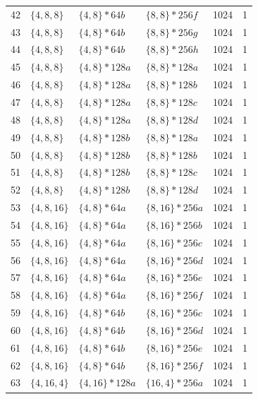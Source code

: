 \begin{longtable}{rllllr}
42 & \(\{4,8,8\}\) & \(\{4,8\}\!\ast 64b\) & \(\{8,8\}\!\ast 256f\) & 1024 & 1 \\
43 & \(\{4,8,8\}\) & \(\{4,8\}\!\ast 64b\) & \(\{8,8\}\!\ast 256g\) & 1024 & 1 \\
44 & \(\{4,8,8\}\) & \(\{4,8\}\!\ast 64b\) & \(\{8,8\}\!\ast 256h\) & 1024 & 1 \\
45 & \(\{4,8,8\}\) & \(\{4,8\}\!\ast 128a\) & \(\{8,8\}\!\ast 128a\) & 1024 & 1 \\
46 & \(\{4,8,8\}\) & \(\{4,8\}\!\ast 128a\) & \(\{8,8\}\!\ast 128b\) & 1024 & 1 \\
47 & \(\{4,8,8\}\) & \(\{4,8\}\!\ast 128a\) & \(\{8,8\}\!\ast 128c\) & 1024 & 1 \\
48 & \(\{4,8,8\}\) & \(\{4,8\}\!\ast 128a\) & \(\{8,8\}\!\ast 128d\) & 1024 & 1 \\
49 & \(\{4,8,8\}\) & \(\{4,8\}\!\ast 128b\) & \(\{8,8\}\!\ast 128a\) & 1024 & 1 \\
50 & \(\{4,8,8\}\) & \(\{4,8\}\!\ast 128b\) & \(\{8,8\}\!\ast 128b\) & 1024 & 1 \\
51 & \(\{4,8,8\}\) & \(\{4,8\}\!\ast 128b\) & \(\{8,8\}\!\ast 128c\) & 1024 & 1 \\
52 & \(\{4,8,8\}\) & \(\{4,8\}\!\ast 128b\) & \(\{8,8\}\!\ast 128d\) & 1024 & 1 \\
53 & \(\{4,8,16\}\) & \(\{4,8\}\!\ast 64a\) & \(\{8,16\}\!\ast 256a\) & 1024 & 1 \\
54 & \(\{4,8,16\}\) & \(\{4,8\}\!\ast 64a\) & \(\{8,16\}\!\ast 256b\) & 1024 & 1 \\
55 & \(\{4,8,16\}\) & \(\{4,8\}\!\ast 64a\) & \(\{8,16\}\!\ast 256c\) & 1024 & 1 \\
56 & \(\{4,8,16\}\) & \(\{4,8\}\!\ast 64a\) & \(\{8,16\}\!\ast 256d\) & 1024 & 1 \\
57 & \(\{4,8,16\}\) & \(\{4,8\}\!\ast 64a\) & \(\{8,16\}\!\ast 256e\) & 1024 & 1 \\
58 & \(\{4,8,16\}\) & \(\{4,8\}\!\ast 64a\) & \(\{8,16\}\!\ast 256f\) & 1024 & 1 \\
59 & \(\{4,8,16\}\) & \(\{4,8\}\!\ast 64b\) & \(\{8,16\}\!\ast 256c\) & 1024 & 1 \\
60 & \(\{4,8,16\}\) & \(\{4,8\}\!\ast 64b\) & \(\{8,16\}\!\ast 256d\) & 1024 & 1 \\
61 & \(\{4,8,16\}\) & \(\{4,8\}\!\ast 64b\) & \(\{8,16\}\!\ast 256e\) & 1024 & 1 \\
62 & \(\{4,8,16\}\) & \(\{4,8\}\!\ast 64b\) & \(\{8,16\}\!\ast 256f\) & 1024 & 1 \\
63 & \(\{4,16,4\}\) & \(\{4,16\}\!\ast 128a\) & \(\{16,4\}\!\ast 256a\) & 1024 & 1 \\

\end{longtable}
